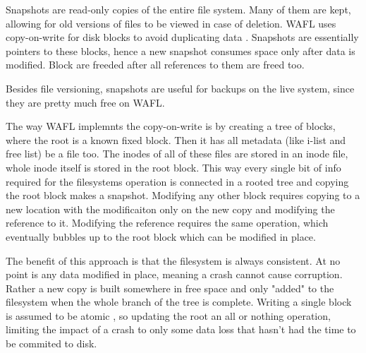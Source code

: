             Snapshots are read-only copies of the entire file system. Many of
            them are kept, allowing for old versions of files to be viewed in
            case of deletion. WAFL uses copy-on-write for disk blocks to avoid
            duplicating data \cite{WAFL}. Snapshots are essentially pointers to
            these blocks, hence a new snapshot consumes space only after data
            is modified. Block are freeded after all references to them are
            freed too.

            Besides file versioning, snapshots are useful for backups on the
            live system, since they are pretty much free on WAFL.


            The way WAFL implemnts the copy-on-write is by creating a tree of
            blocks, where the root is a known fixed block. Then it has all
            metadata (like i-list and free list) be a file too. The inodes of
            all of these files are stored in an inode file, whole inode itself
            is stored in the root block. This way every single bit of info
            required for the filesystems operation is connected in a rooted
            tree and copying the root block makes a snapshot. Modifying any
            other block requires copying to a new location with the
            modificaiton only on the new copy and modifying the reference to
            it. Modifying the reference requires the same operation, which
            eventually bubbles up to the root block which can be modified in
            place.

            The benefit of this approach is that the filesystem is always
            consistent. At no point is any data modified in place, meaning a
            crash cannot cause corruption. Rather a new copy is built somewhere
            in free space and only "added" to the filesystem when the whole
            branch of the tree is complete. Writing a single block is assumed
            to be atomic \cite{???}, so updating the root an all or nothing
            operation, limiting the impact of a crash to only some data loss
            that hasn't had the time to be commited to disk.
